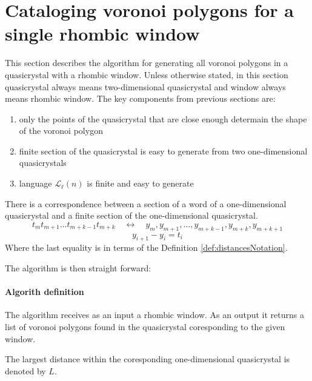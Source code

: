 \documentclass[text.tex]{subfiles}
\begin{document}
\section{Cataloging voronoi polygons for a single rhombic window}
This section describes the algorithm for generating all voronoi polygons in a quasicrystal with a rhombic window. Unless otherwise stated, in this section quasicrystal always means two-dimensional quasicrystal and window always means rhombic window. The key components from previous sections are:

\begin{enumerate}
\item only the points of the quasicrystal that are close enough determain the shape of the voronoi polygon
\item finite section of the quasicrystal is easy to generate from two one-dimensional quasicrystals
\item language $\mathcal{L}_{\ell}(n)$ is finite and easy to generate
\end{enumerate}

There is a correspondence between a section of a word of a one-dimensional quasicrystal and a finite section of the one-dimensional quasicrystal. 
$$t_m t_{m+1}\dots t_{m+k-1} t_{m+k}\quad\longleftrightarrow\quad y_m, y_{m+1},\dots ,y_{m+k-1},y_{m+k},y_{m+k+1}$$
$$y_{i+1}-y_{i} = t_{i}$$
Where the last equality is in terms of the Definition \ref{def:distancesNotation}.

The algorithm is then straight forward:

\paragraph{Algorith definition} The algorithm receives as an input a rhombic window. As an output it returns a list of voronoi polygons found in the quasicrystal coresponding to the given window.

The largest distance within the coresponding one-dimensional quasicrystal is denoted by $L$. 
\end{document}
